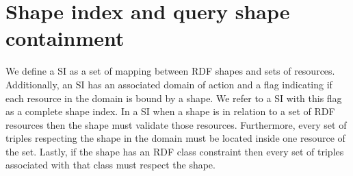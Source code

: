 \section{Shape index and query shape containment}

We define a SI as a set of mapping between RDF shapes and sets of resources.
Additionally, an SI has an associated domain of action
and a flag indicating if each resource in the domain is bound by a shape. 
We refer to a SI with this flag as a complete shape index.
In a SI when a shape is in relation to a set of RDF resources then the shape must validate those resources.
Furthermore, every set of triples respecting the shape in the domain must be located inside one resource of the set.
Lastly, if the shape has an RDF class constraint
then every set of triples associated with that class must respect the shape.

